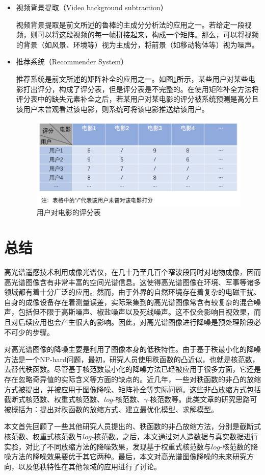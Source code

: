 \documentclass[12pt, a4paper]{article}
\begin{document}
\begin{itemize}
\item 视频背景提取（Video background subtraction）
\par 视频背景提取是前文所述的鲁棒的主成分分析法的应用之一。若给定一段视频，则可以将这段视频的每一帧拼接起来，构成一个矩阵。那么，可以将视频的背景（如风景、环境等）视为主成分，将前景（如移动物体等）视为噪声。
\item 推荐系统（Recommender System）
\par 推荐系统是前文所述的矩阵补全的应用之一。如图\ref{recommender-system}所示，某些用户对某些电影打出评分，构成了评分表，但是评分表是不完整的。在使用矩阵补全方法将评分表中的缺失元素补全之后，若某用户对某电影的评分被系统预测是高分且该用户未曾观看过该电影，则系统可将该电影推送给该用户。
\begin{figure}[H]
\centering
\includegraphics[scale=0.7]{recommender-system.png}
\caption{用户对电影的评分表}
\label{recommender-system}
\end{figure}
\end{itemize}
\newpage
\section{总结}
\par 高光谱遥感技术利用成像光谱仪，在几十乃至几百个窄波段同时对地物成像，因而高光谱图像含有非常丰富的空间光谱信息。这使得高光谱图像在环境、军事等诸多领域都有着十分广泛的应用。然而，由于外界的自然环境存在着复杂的电磁干扰、自身的成像设备存在着测量误差，实际采集到的高光谱图像常含有较复杂的混合噪声，包括但不限于高斯噪声、椒盐噪声以及死线噪声。这不仅会影响目视效果，而且对后续应用也会产生很大的影响。因此，对高光谱图像进行降噪是预处理阶段必不可少的步骤。
\par 对高光谱图像的降噪主要是利用了图像本身的低秩特性。由于基于秩最小化的降噪方法是一个NP-hard问题，最初，研究人员使用秩函数的凸近似，也就是核范数，去替代秩函数。尽管基于核范数最小化的降噪方法已经被应用于很多方面，它还是存在忽略奇异值的实际含义等方面的缺点的。近几年，一些对秩函数的非凸的放缩方式被提出，并被应用于图像降噪、矩阵补全等实际问题。这些非凸放缩方式包括截断式核范数、权重式核范数、$log$-核范数、$\gamma$-核范数等。此类文章的研究思路可被概括为：提出对秩函数的放缩方式、建立最优化模型、求解模型。
\par 本文首先回顾了一些其他研究人员提出的、秩函数的非凸放缩方法，分别是截断式核范数、权重式核范数与$log$-核范数。之后，本文通过对人造数据与真实数据进行实验，对比了不同放缩方法的降噪效果，发现基于权重式核范数与$log$-核范数的降噪方法的降噪效果要优于其它两种。最后，本文对高光谱图像降噪的未来研究方向，以及低秩特性在其他领域的应用进行了讨论。
	
\end{document}
